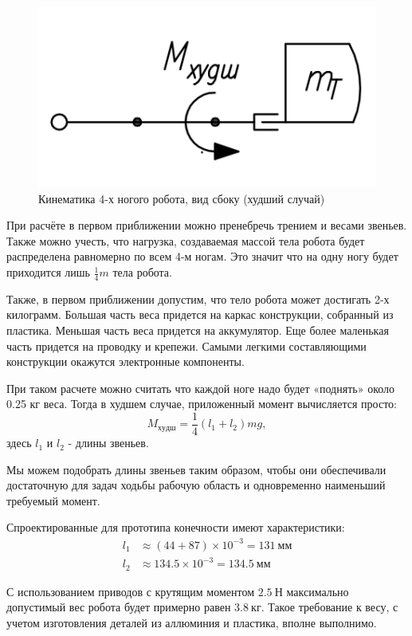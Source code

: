 \begin{figure}[ht]
    \centering
    \includegraphics[scale=1]{kin2.png}
    \caption{Кинематика 4-х ногого робота, вид сбоку (худший случай)}
\end{figure}

При расчёте в первом приближении можно пренебречь трением и весами звеньев. Также можно учесть, что нагрузка, создаваемая массой тела робота будет распределена равномерно по всем 4-м ногам. Это значит что на одну ногу будет приходится лишь $\frac{1}{4}m$ тела робота.

Также, в первом приближении допустим, что тело робота может достигать 2-х килограмм. Большая часть веса придется на каркас конструкции, собранный из пластика. Меньшая часть веса придется на аккумулятор. Еще более маленькая часть придется на проводку и крепежи. Самыми легкими составляющими конструкции окажутся электронные компоненты.

При таком расчете можно считать что каждой ноге надо будет «поднять» около 0.25 кг веса. Тогда в худшем случае, приложенный момент вычисляется просто:
$$ M_{худш}= \frac 1 4 (l_{1}+l_{2}) m g, $$
\noindent здесь $l_1$ и $l_2$ - длины звеньев.

Мы можем подобрать длины звеньев таким образом, чтобы они обеспечивали достаточную для задач ходьбы рабочую область и одновременно наименьший требуемый момент.

Спроектированные для прототипа конечности имеют характеристики:
\begin{align*}
    l_1 &\approx (44 + 87) \times 10^{-3} = 131\: мм \\
    l_2 &\approx 134.5 \times 10^{-3} = 134.5\: мм
\end{align*}

\noindent С использованием приводов с крутящим моментом $ 2.5 \: Н $ максимально допустимый вес робота будет примерно равен $ 3.8 \: кг $. Такое требование к весу, с учетом изготовления деталей из аллюминия и пластика, вполне выполнимо.


